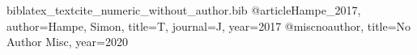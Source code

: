 \begin{filecontents*}{biblatex_textcite_numeric_without_author.bib}
@article{Hampe_2017, author={Hampe, Simon}, title={T}, journal={J}, year={2017}}
@misc{noauthor, title={No Author Misc}, year={2020}}
\end{filecontents*}
\documentclass{article}
\usepackage[style=numeric]{biblatex}


\textcite{Hampe_2017} showed it.
\textcite{noauthor} said it.
\printbibliography


